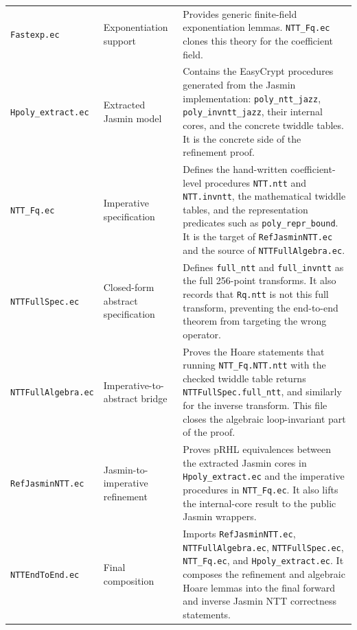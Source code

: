 \begin{longtable}{
  >{\raggedright\arraybackslash}p{}
  >{\raggedright\arraybackslash}p{}
  >{\raggedright\arraybackslash}p{}}
\texttt{Fastexp.ec} &
Exponentiation support &
Provides generic finite-field exponentiation lemmas.  \texttt{NTT\_Fq.ec}
clones this theory for the \haetae{} coefficient field. \\

\texttt{Hpoly\_extract.ec} &
Extracted Jasmin model &
Contains the EasyCrypt procedures generated from the Jasmin implementation:
\texttt{poly\_ntt\_jazz}, \texttt{poly\_invntt\_jazz}, their internal cores,
and the concrete twiddle tables.  It is the concrete side of the refinement
proof. \\

\texttt{NTT\_Fq.ec} &
Imperative specification &
Defines the hand-written coefficient-level procedures
\texttt{NTT.ntt} and \texttt{NTT.invntt}, the mathematical twiddle tables, and
the representation predicates such as \texttt{poly\_repr\_bound}.  It is the
target of \texttt{RefJasminNTT.ec} and the source of \texttt{NTTFullAlgebra.ec}. \\

\texttt{NTTFullSpec.ec} &
Closed-form abstract specification &
Defines \texttt{full\_ntt} and \texttt{full\_invntt} as the full 256-point
\haetae{} transforms.  It also records that \texttt{Rq.ntt} is not this full
transform, preventing the end-to-end theorem from targeting the wrong
operator. \\

\texttt{NTTFullAlgebra.ec} &
Imperative-to-abstract bridge &
Proves the Hoare statements that running \texttt{NTT\_Fq.NTT.ntt} with the
checked twiddle table returns \texttt{NTTFullSpec.full\_ntt}, and similarly for
the inverse transform.  This file closes the algebraic loop-invariant part of
the proof. \\

\texttt{RefJasminNTT.ec} &
Jasmin-to-imperative refinement &
Proves pRHL equivalences between the extracted Jasmin cores in
\texttt{Hpoly\_extract.ec} and the imperative procedures in \texttt{NTT\_Fq.ec}.
It also lifts the internal-core result to the public Jasmin wrappers. \\

\texttt{NTTEndToEnd.ec} &
Final composition &
Imports \texttt{RefJasminNTT.ec}, \texttt{NTTFullAlgebra.ec},
\texttt{NTTFullSpec.ec}, \texttt{NTT\_Fq.ec}, and
\texttt{Hpoly\_extract.ec}.  It composes the refinement and algebraic Hoare
lemmas into the final forward and inverse Jasmin NTT correctness statements. \\

\end{longtable}
\normalsize

